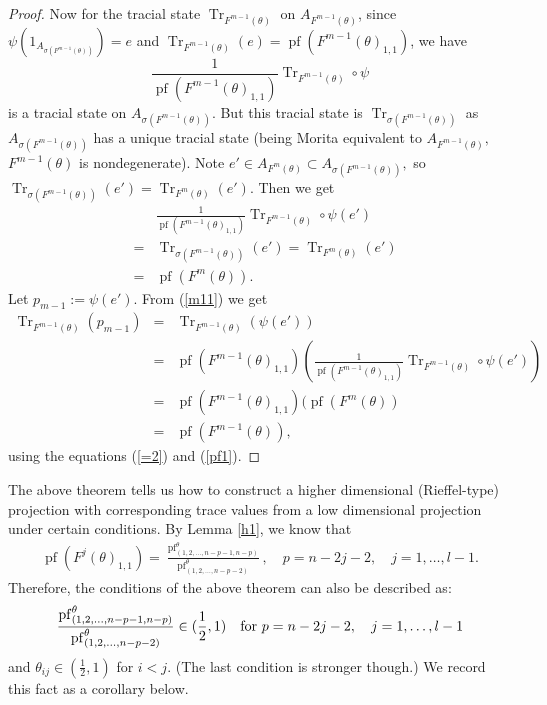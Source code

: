 \documentclass[9pt, BCOR=2mm]{amsart}
\numberwithin{equation}{section}
\numberwithin{equation}{section}
\newcommand{\pf}{{\operatorname{pf}}}
\DeclareMathOperator{\Tr}{Tr}
\begin{document}
\begin{proof}
Now for the tracial state $\Tr_{F^{m-1}(\theta)}$ on $A_{F^{m-1}(\theta)}$, since $\psi(1_{A_{\sigma(F^{m-1}(\theta))}})=e$ and $\Tr_{F^{m-1}(\theta)}(e)={\pf}(F^{m-1}(\theta)_{1,1})$, we have $$\frac{1}{{\pf}(F^{m-1}(\theta)_{1,1})}\Tr_{F^{m-1}(\theta)}\circ \psi$$ is a tracial state on $A_{\sigma(F^{m-1}(\theta))}.$ But this tracial state is $\Tr_{\sigma(F^{m-1}(\theta))}$ as $A_{\sigma(F^{m-1}(\theta))}$ has a unique tracial state (being Morita equivalent to $A_{F^{m-1}(\theta)},$ $F^{m-1}(\theta)$ is nondegenerate). Note $e'\in A_{F^{m}(\theta)}\subset A_{\sigma(F^{m-1}(\theta))},$ so
$\Tr_{\sigma(F^{m-1}(\theta))}(e')=\Tr_{F^{m}(\theta)}(e').$
Then we get
\begin{eqnarray}
&&\frac{1}{{\pf}(F^{m-1}(\theta)_{1,1})}\Tr_{F^{m-1}(\theta)}\circ \psi (e')\nonumber\\
&=&\Tr_{\sigma(F^{m-1}(\theta))}(e')=\Tr_{F^{m}(\theta)}(e')\nonumber\\
&=&{\pf}(F^m(\theta)).\label{m11}
\end{eqnarray}
 Let $p_{m-1}:=\psi(e').$
From (\ref{m11}) we get
\begin{eqnarray}
\Tr_{F^{m-1}(\theta)}(p_{m-1})&=&\Tr_{F^{m-1}(\theta)}
(\psi(e'))\nonumber\\
&=&{\pf}(F^{m-1}(\theta)_{1,1})(\frac{1}{{\pf}(F^{m-1}(\theta)_{1,1})}\Tr_{F^{m-1}(\theta)}\circ \psi (e'))\nonumber\\
&=&{\pf}(F^{m-1}(\theta)_{1,1})({\pf}(F^m(\theta))\nonumber\\
&=&{\pf}(F^{m-1}(\theta)),
\end{eqnarray}
using the equations (\ref{=2}) and (\ref{pf1}). 
\end{proof}


The above theorem tells us how to construct a higher dimensional (Rieffel-type) projection with corresponding trace values from a low dimensional projection under certain conditions. By Lemma \ref{h1}, we know that
\begin{eqnarray}{\pf}(F^j(\theta)_{1,1})=\frac{{\pf}^{\theta}_{(1,2,\dots,n-p-1,n-p)}}{{\pf}^{\theta}_{(1,2,\dots,n-p-2)}},\quad  p=n-2j-2,\quad j=1,\dots,l-1.
\end{eqnarray}
Therefore, the conditions of the above theorem can also be described as:
\begin{eqnarray}\frac{{\pf}^{\theta}_{(1,2,\dots,n-p-1,n-p)}}{{\pf}^{\theta}_{(1,2,\dots,n-p-2)}}\in (\frac{1}{2},1)\quad {\rm for}\,\, p=n-2j-2,\quad j=1,\dots,l-1
\end{eqnarray}
and $\theta_{ij} \in (\frac{1}{2},1)$ for $i<j.$ (The last condition is stronger though.)
We record this fact as a corollary below.
\end{document}
